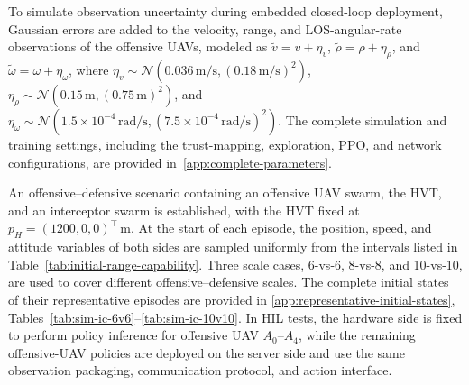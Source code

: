 \documentclass[unbranded]{cja}
\begin{document}
To simulate observation uncertainty during embedded closed-loop deployment, Gaussian errors are added to the velocity, range, and LOS-angular-rate observations of the offensive UAVs, modeled as $\tilde v=v+\eta_v$, $\tilde\rho=\rho+\eta_\rho$, and $\tilde\omega=\omega+\eta_\omega$, where $\eta_v\sim\mathcal{N}\!\left(0.036\,\mathrm{m/s},(0.18\,\mathrm{m/s})^2\right)$, $\eta_\rho\sim\mathcal{N}\!\left(0.15\,\mathrm{m},(0.75\,\mathrm{m})^2\right)$, and $\eta_\omega\sim\mathcal{N}\!\left(1.5\times10^{-4}\,\mathrm{rad/s},(7.5\times10^{-4}\,\mathrm{rad/s})^2\right)$.
The complete simulation and training settings, including the trust-mapping, exploration, PPO, and network configurations, are provided in~\ref{app:complete-parameters}.


An offensive--defensive scenario containing an offensive UAV swarm, the HVT, and an interceptor swarm is established, with the HVT fixed at $p_H=(1200,0,0)^\top\,\mathrm{m}$. 
At the start of each episode, the position, speed, and attitude variables of both sides are sampled uniformly from the intervals listed in Table~\ref{tab:initial-range-capability}.
Three scale cases, 6-vs-6, 8-vs-8, and 10-vs-10, are used to cover different offensive--defensive scales. The complete initial states of their representative episodes are provided in \ref{app:representative-initial-states}, Tables~\ref{tab:sim-ic-6v6}--\ref{tab:sim-ic-10v10}. In HIL tests, the hardware side is fixed to perform policy inference for offensive UAV $A_0$--$A_4$, while the remaining offensive-UAV policies are deployed on the server side and use the same observation packaging, communication protocol, and action interface.
\end{document}
